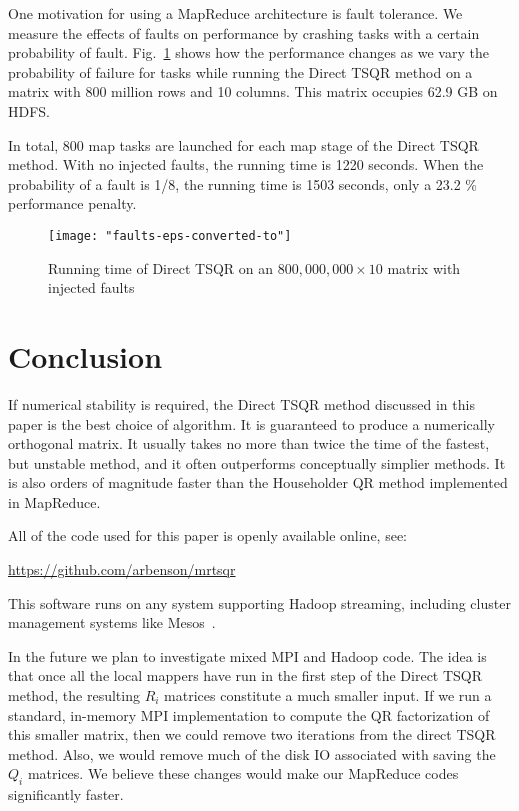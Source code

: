 \documentclass[10pt, conference, compsocconf]{IEEEtran}
\begin{document}
One motivation for using a MapReduce architecture is fault tolerance.  We measure the effects of faults on performance by crashing tasks with a certain probability of fault.  Fig.~\ref{fig:faults} shows how the performance changes as we vary the probability of failure for tasks while running the Direct TSQR method on a matrix with 800 million rows and 10 columns.  This matrix occupies 62.9 GB on HDFS.

In total, 800 map tasks are launched for each map stage of the Direct TSQR method.  With no injected faults, the running time is 1220 seconds.  When the probability of a fault is 1/8, the running time is 1503 seconds, only a 23.2 \% performance penalty.

\begin{figure}
\texttt{[image: "faults-eps-converted-to"]}
\caption{Running time of Direct TSQR on an $800,000,000 \times 10$ matrix with injected faults}
\label{fig:faults}
\end{figure}

\section{Conclusion}

If numerical stability is required, the Direct TSQR method discussed in this paper is the best choice of algorithm.  It is guaranteed to produce a numerically orthogonal matrix.  It usually takes no more than twice the time of the fastest, but unstable method, and it often outperforms conceptually simplier methods. It is also orders of magnitude faster than the Householder QR method implemented in MapReduce. 

All of the code used for this paper is openly available online, see: \begin{center}
\url{https://github.com/arbenson/mrtsqr} \end{center}
This software runs on any system supporting Hadoop streaming, including cluster management systems like Mesos~\cite{Mesos2011}.  

In the future we plan to investigate mixed MPI and Hadoop code.  The idea is that once all the local mappers have run in the first step of the Direct TSQR method, the resulting $R_i$ matrices constitute a much smaller input.  If we run a standard, in-memory MPI implementation to compute the QR factorization of this smaller matrix, then we could remove two iterations from the direct TSQR method.  Also, we would remove much of the disk IO associated with saving the $Q_i$ matrices.  We believe these changes would make our MapReduce codes significantly faster.
\end{document}
